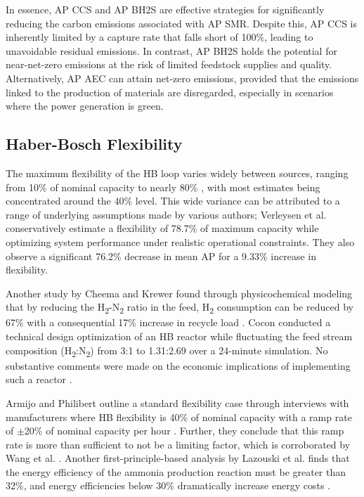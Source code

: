 \documentclass{article}
\begin{document}
In essence, AP CCS and AP BH2S are effective strategies for significantly reducing the carbon emissions associated with AP SMR. Despite this, AP CCS is inherently limited by a capture rate that falls short of 100\%, leading to unavoidable residual emissions. In contrast, AP BH2S holds the potential for near-net-zero emissions at the risk of limited feedstock supplies and quality. Alternatively, AP AEC can attain net-zero emissions, provided that the emissions linked to the production of materials are disregarded, especially in scenarios where the power generation is green.

\subsection{Haber-Bosch Flexibility}

The maximum flexibility of the HB loop varies widely between sources, ranging from 10\% of nominal capacity \cite{Ostundi2011} to nearly 80\% \cite{Verleysen2023}, with most estimates being concentrated around the 40\% level. This wide variance can be attributed to a range of underlying assumptions made by various authors; Verleysen et al. conservatively estimate a flexibility of 78.7\% of maximum capacity while optimizing system performance under realistic operational constraints\cite{Verleysen2023}. They also observe a significant 76.2\% decrease in mean AP for a 9.33\% increase in flexibility.

Another study by Cheema and Krewer found through physicochemical modeling that by reducing the H\textsubscript{2}-N\textsubscript{2} ratio in the feed, H\textsubscript{2} consumption can be reduced by 67\% with a consequential 17\% increase in recycle load \cite{Cheema2018}. Cocon conducted a technical design optimization of an HB reactor while fluctuating the feed stream composition (H\textsubscript{2}:N\textsubscript{2}) from 3:1 to 1.31:2.69 over a 24-minute simulation. No substantive comments were made on the economic implications of implementing such a reactor \cite{cocon2021towards}.

Armijo and Philibert outline a standard flexibility case through interviews with manufacturers where HB flexibility is 40\% of nominal capacity with a ramp rate of $\pm$20\% of nominal capacity per hour \cite{Armijo2020}. Further, they conclude that this ramp rate is more than sufficient to not be a limiting factor, which is corroborated by Wang et al. \cite{Wang2023}. Another first-principle-based analysis by Lazouski et al. finds that the energy efficiency of the ammonia production reaction must be greater than 32\%, and energy efficiencies below 30\% dramatically increase energy costs \cite{Lazouski2022}.
\end{document}
